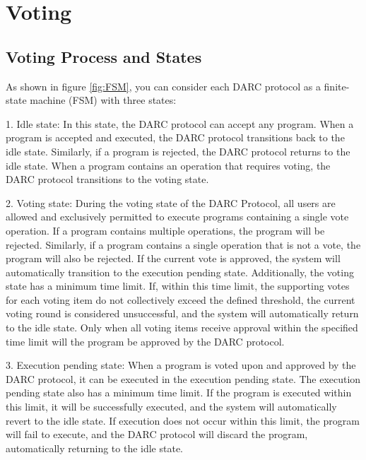 \documentclass[main.tex]{subfiles}
\begin{document}
\section{Voting}

\subsection{Voting Process and States}

As shown in figure \ref{fig:FSM}, you can consider each DARC protocol as a finite-state machine (FSM) with three states:

1. Idle state: In this state, the DARC protocol can accept any program. When a program is accepted and executed, the DARC protocol transitions back to the idle state. Similarly, if a program is rejected, the DARC protocol returns to the idle state. When a program contains an operation that requires voting, the DARC protocol transitions to the voting state.

2. Voting state: During the voting state of the DARC Protocol, all users are allowed and exclusively permitted to execute programs containing a single vote operation. If a program contains multiple operations, the program will be rejected. Similarly, if a program contains a single operation that is not a vote, the program will also be rejected. If the current vote is approved, the system will automatically transition to the execution pending state. Additionally, the voting state has a minimum time limit. If, within this time limit, the supporting votes for each voting item do not collectively exceed the defined threshold, the current voting round is considered unsuccessful, and the system will automatically return to the idle state. Only when all voting items receive approval within the specified time limit will the program be approved by the DARC protocol.

3. Execution pending state: When a program is voted upon and approved by the DARC protocol, it can be executed in the execution pending state. The execution pending state also has a minimum time limit. If the program is executed within this limit, it will be successfully executed, and the system will automatically revert to the idle state. If execution does not occur within this limit, the program will fail to execute, and the DARC protocol will discard the program, automatically returning to the idle state.
\end{document}
